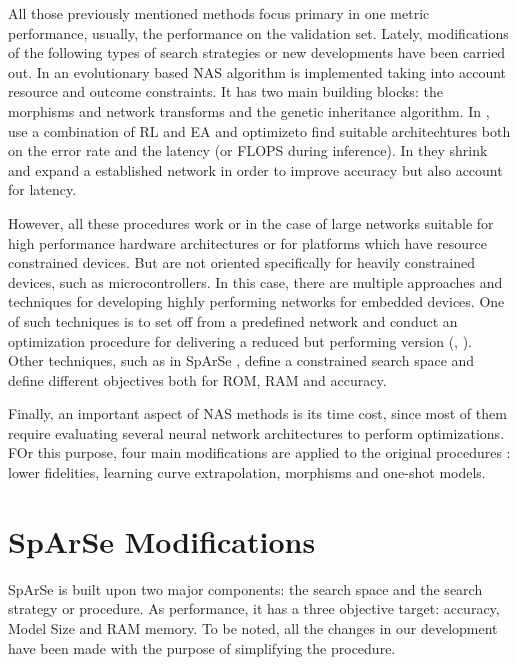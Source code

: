 \documentclass[a4paper, twocolumn]{article}
\begin{document}
All those previously mentioned methods focus primary in one metric performance, usually, the performance on the validation set. Lately, modifications of the following types of search strategies or new developments have been carried out. In \cite{Elsken2018} an evolutionary based NAS algorithm is implemented taking into account resource and outcome constraints. It has two main building blocks: the morphisms and network transforms and the genetic inheritance algorithm. In \cite{Chu2019}, use a combination of RL and EA and optimizeto find suitable architechtures both on the error rate and the latency (or FLOPS during inference). In \cite{Gordon2017} they shrink and expand a established network in order to improve accuracy but also account for latency.

However, all these procedures work or in the case of large networks suitable for high performance hardware architectures or for platforms which have resource constrained devices. But are not oriented specifically for heavily constrained devices, such as microcontrollers. In this case, there are  multiple approaches and techniques for developing highly performing networks for embedded devices. One of such techniques is to set off from a predefined network and conduct an optimization procedure for delivering a reduced but performing version (\cite{Loni2020}, \cite{Cai2019f}). Other techniques, such as in SpArSe \cite{Fedorov2019}, define a constrained search space and define different objectives both for ROM, RAM and accuracy.

Finally, an important aspect of NAS methods is its time cost, since most of them require evaluating several neural network architectures to perform optimizations. FOr this purpose, four main modifications are applied to the original procedures \cite{Elsken2019a}: lower fidelities, learning curve extrapolation, morphisms and one-shot models.

\section{SpArSe Modifications}\label{Sparsemod}

SpArSe is built upon two major components: the search space and the search strategy or procedure. As performance, it has a three objective target: accuracy, Model Size and RAM memory. To be noted, all the changes in our development have been made with the purpose of simplifying the procedure.  
\end{document}
